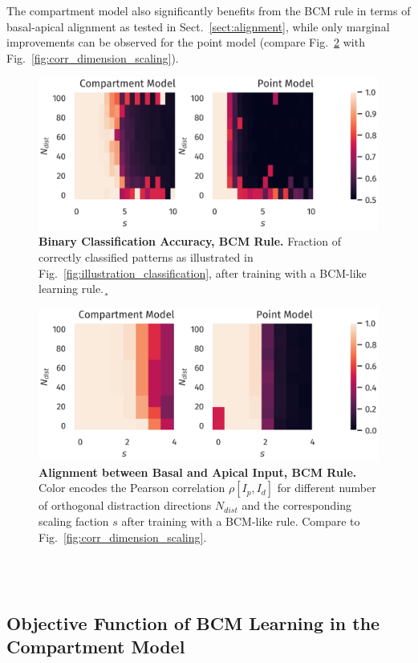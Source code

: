 \documentclass[utf8]{frontiersSCNS} %
\begin{document}
The compartment model also significantly benefits from
the BCM rule in terms of basal-apical alignment as tested in 
Sect.~\ref{sect:alignment}, while only marginal
improvements can be observed for the point model
(compare Fig.~\ref{fig:corr_dimension_scaling_bcm} 
with Fig.~\ref{fig:corr_dimension_scaling}).
\begin{figure}
\centering
\includegraphics[width=0.7\columnwidth]{classification_dimension_scaling_bcm_high_input_dim}
\caption{{\bf Binary Classification Accuracy, BCM Rule.}
	Fraction of correctly classified patterns as illustrated in
	Fig.~\ref{fig:illustration_classification}, after training with
	a BCM-like learning rule.¸}
\label{fig:classification_accuracy_bcm}
\end{figure}
\begin{figure}
\centering
\includegraphics[width=0.7\columnwidth]{corr_dimension_scaling_bcm_high_input_dim}
\caption{{\bf Alignment between Basal and Apical Input, BCM Rule.}
	Color encodes the Pearson correlation $\rho[I_p,I_d]$ for different
	number of orthogonal distraction directions $N_{dist}$ 
	and the corresponding scaling faction $s$ after training
	with a BCM-like rule. Compare to Fig.~\ref{fig:corr_dimension_scaling}.}
\label{fig:corr_dimension_scaling_bcm}
\end{figure}
\\
\\
\subsection{Objective Function of BCM Learning in the Compartment Model}
\label{sect:Obj_Func}
\end{document}
